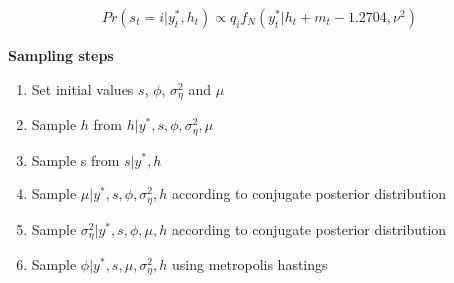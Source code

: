 \documentclass[
  12pt,
  letterpaper,
  DIV=11,
  numbers=noendperiod]{scrartcl}
\begin{document}
\[
\begin{aligned}
Pr(s_t = i | y_t^{\ast}, h_t) \propto q_i f_N(y_t^{\ast} | h_t + m_t - 1.2704, \nu^2)
\end{aligned}
\]

\textbf{Sampling steps}

\begin{enumerate}
\def\labelenumi{\arabic{enumi}.}
\item
  Set initial values \(s\), \(\phi\), \(\sigma^2_{\eta}\) and \(\mu\)
\item
  Sample \(h\) from \(h|y^{\ast}, s, \phi, \sigma^2_{\eta}, \mu\)
\item
  Sample s from \(s|y^{\ast}, h\)
\item
  Sample \(\mu|y^{\ast}, s, \phi, \sigma^2_{\eta}, h\) according to
  conjugate posterior distribution
\item
  Sample \(\sigma_{\eta}^2|y^{\ast}, s, \phi, \mu, h\) according to
  conjugate posterior distribution
\item
  Sample \(\phi|y^{\ast}, s, \mu, \sigma^2_{\eta}, h\) using metropolis
  hastings
\end{enumerate}
\end{document}
